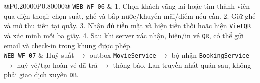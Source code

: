 \begin{longtable}{@{}P{0.20000\SRSWidth}P{0.80000\SRSWidth}@{}}
\texttt{WEB-\allowbreak{}WF-\allowbreak{}06} & 1. Chọn khách vãng lai hoặc tìm thành viên qua điện thoại; chọn suất, ghế và bắp nước/\allowbreak{}khuyến mãi/\allowbreak{}điểm nếu cần. 2. Giữ ghế và mở thu tiền tại quầy. 3. Nhận đủ tiền mặt và hiện tiền thối hoặc hiện \texttt{Viet\allowbreak{}QR} và xác minh mỗi ba giây. 4. Sau khi server xác nhận, hiện/\allowbreak{}in vé \texttt{QR}, có thể gửi email và check-in trong khung được phép. \\[3pt]
\texttt{WEB-\allowbreak{}WF-\allowbreak{}07} & Huỷ suất \ensuremath{\rightarrow} outbox \texttt{Movie\allowbreak{}Service} \ensuremath{\rightarrow} bộ nhận \texttt{Booking\allowbreak{}Service} \ensuremath{\rightarrow} huỷ vé/\allowbreak{}tạo hoàn vé đã trả \ensuremath{\rightarrow} thông báo. Lan truyền nhất quán sau, không phải giao dịch xuyên \texttt{DB}. \\[3pt]
\end{longtable}
\endgroup

